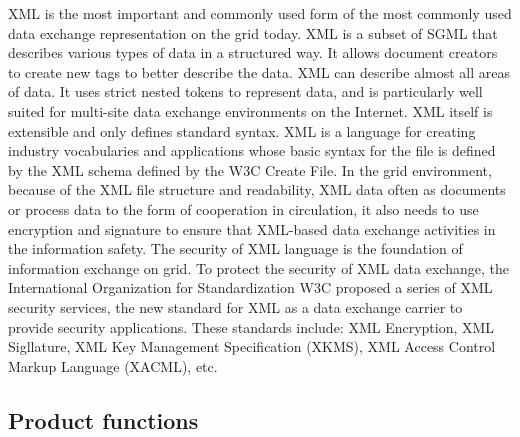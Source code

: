 XML is the most important and commonly used form of the most commonly used data exchange representation on the grid today.
XML is a subset of SGML that describes various types of data in a structured way.
It allows document creators to create new tags to better describe the data.
XML can describe almost all areas of data.
It uses strict nested tokens to represent data, and is particularly well suited for multi-site data exchange environments on the Internet.
XML itself is extensible and only defines standard syntax.
XML is a language for creating industry vocabularies and applications whose basic syntax for the file is defined by the XML schema defined by the W3C Create File.
In the grid environment, because of the XML file structure and readability, XML data often as documents or process data to the form of cooperation in circulation, it also needs to use encryption and signature to ensure that XML-based data exchange activities in the information safety.
The security of XML language is the foundation of information exchange on grid.
To protect the security of XML data exchange, the International Organization for Standardization W3C proposed a series of XML security services, the new standard for XML as a data exchange carrier to provide security applications.
These standards include: XML Encryption, XML Sigllature, XML Key Management Specification (XKMS), XML Access Control Markup Language (XACML), etc.

\subsection{Product functions}
% 

